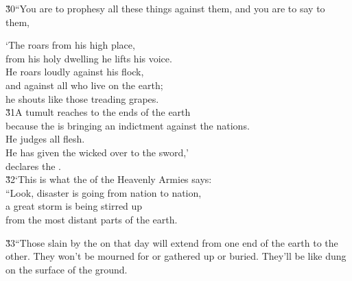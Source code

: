 \v{30}``You are to prophesy all these things against them, and you are to say to them,

\begin{poetry}
\poeml `The  roars from his high place, \\
\poemll    from his holy dwelling he lifts his voice. \\
\poeml He roars loudly against his flock, \\
\poemll    and against all who live on the earth; \\
\poemlll       he shouts like those treading grapes. \\
\poeml \v{31}A tumult reaches to the ends of the earth \\
\poemll    because the  is bringing an indictment against the nations. \\
\poeml He judges all flesh. \\
\poemll    He has given the wicked over to the sword,' \\
\poemlll       declares the . \\
\poeml \v{32}`This is what the  of the Heavenly Armies says: \\
\poemll    ``Look, disaster is going from nation to nation, \\
\poeml a great storm is being stirred up \\
\poemll    from the most distant parts of the earth.
\end{poetry}

\v{33}``Those slain by the  on that day will extend from one end of the earth to the other. They won't be mourned for or gathered up or buried. They'll be like dung on the surface of the ground.

